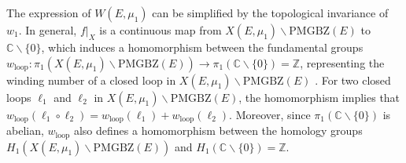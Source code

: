 The expression of $W(E,\mu_1)$ can be simplified by the topological invariance
of $w_{1}$. In general, $f|_{X}$ is a continuous map from $X(E,\mu_{1})\backslash\text{PMGBZ}(E)$
to $\mathbb{C}\backslash\{0\}$, which induces a homomorphism between
the fundamental groups $w_{\text{loop}}:\pi_{1}\left(X(E,\mu_{1})\backslash\text{PMGBZ}(E)\right)\rightarrow\pi_{1}\left(\mathbb{C}\backslash\{0\}\right)=\mathbb{Z}$,
representing the winding number of a closed loop in $X(E,\mu_{1})\backslash\text{PMGBZ}(E)$
\cite{hatcherAlgebraicTopology2001}. For two closed loops $\ell_{1}$
and $\ell_{2}$ in $X(E,\mu_{1})\backslash\text{PMGBZ}(E)$, the homomorphism
implies that $w_{\text{loop}}\left(\ell_{1}\circ\ell_{2}\right)=w_{\text{loop}}\left(\ell_{1}\right)+w_{\text{loop}}\left(\ell_{2}\right)$.
Moreover, since $\pi_{1}\left(\mathbb{C}\backslash\{0\}\right)$ is
abelian, $w_{\text{loop}}$ also defines a homomorphism between the
homology groups $H_{1}\left(X(E,\mu_{1})\backslash\text{PMGBZ}(E)\right)$
and $H_{1}\left(\mathbb{C}\backslash\{0\}\right)=\mathbb{Z}$.

